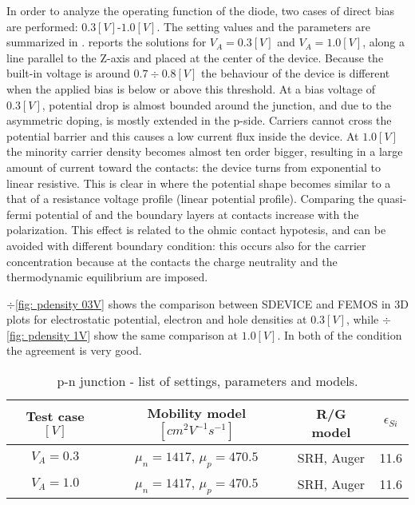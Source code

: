 In order to analyze the operating function of the diode, two cases of direct bias are performed: $0.3[V]$-$1.0[V]$. The setting values and the parameters are summarized in . 
 reports the solutions for $V_A=0.3[V]$ and $V_A=1.0[V]$, along a line parallel to the Z-axis and placed at the center of the device. 
Because the built-in voltage is around $0.7 \div 0.8 [V]$ the behaviour of the device is different when the applied bias is below or above this threshold. 
At a bias voltage of $0.3[V]$, potential drop is almost bounded around the junction, and due to the asymmetric doping, is mostly extended in the p-side. Carriers cannot cross the potential barrier and this causes a low current flux inside the device.
At $1.0[V]$ the minority carrier density becomes almost ten order bigger, resulting in a large amount of current toward the contacts:  the device turns from exponential to linear resistive. This is clear in  where the potential shape becomes similar to a that of a resistance voltage profile (linear potential profile). Comparing the quasi-fermi potential of  and  the boundary layers at contacts increase with the polarization. This effect is related to the ohmic contact hypotesis, and can be avoided with different boundary condition: this occurs also for the carrier concentration because at the contacts the charge neutrality and the thermodynamic equilibrium  are imposed.

$\div$\ref{fig: pdensity 03V} shows the comparison between SDEVICE and FEMOS in 3D plots for electrostatic potential, electron and hole densities at $0.3[V]$, while $\div$\ref{fig: pdensity 1V} show the same comparison at $1.0[V]$. In both of the condition the agreement is very good.

\begin{table}[!h]
\centering
\begin{tabular}{cccc}
\toprule
 Test case $[V]$  & Mobility model $[cm^2V^{-1}s^{-1}]$  & R/G model & $\epsilon_{Si}$\\
\midrule
$V_A=0.3$ & $\mu_n = 1417$, $\mu_p = 470.5$ & SRH, Auger & 11.6 \\
$V_A=1.0$ & $\mu_n = 1417$, $\mu_p = 470.5$ & SRH, Auger & 11.6 \\\bottomrule
\end{tabular}
\caption{p-n junction - list of settings, parameters and models.}
\label{tab: diode direct}
\end{table}



